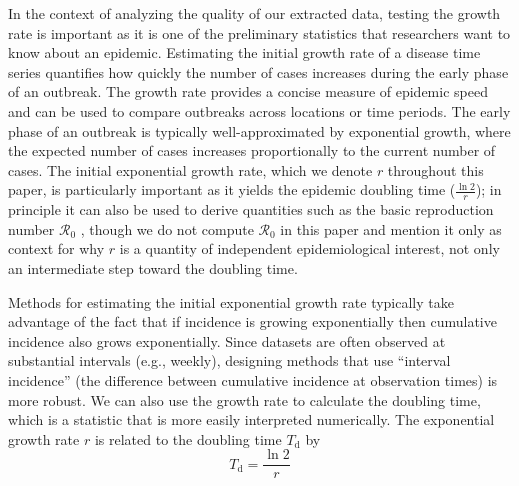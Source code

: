 \documentclass[12pt]{article}
\begin{document}
In the context of analyzing the quality of our extracted data, testing the growth rate is important as it is one of the preliminary statistics that researchers want to know about an epidemic. Estimating the initial growth rate of a disease time series quantifies how quickly the number of cases increases during the early phase of an outbreak. The growth rate provides a concise measure of epidemic speed and can be used to compare outbreaks across locations or time periods. The early phase of an outbreak is typically well-approximated by exponential growth, where the expected number of cases increases proportionally to the current number of cases. The initial exponential growth rate, which we denote $r$ throughout this paper, is particularly important as it yields the epidemic doubling time ($\frac{\ln{2}}{r}$); in principle it can also be used to derive quantities such as the basic reproduction number $\mathcal{R}_0$ \cite{WallLips07}, though we do not compute $\mathcal{R}_0$ in this paper and mention it only as context for why $r$ is a quantity of independent epidemiological interest, not only an intermediate step toward the doubling time.

Methods for estimating the initial exponential growth rate \cite{Ma2014,JaganRpkg} typically take advantage of the fact that if incidence is growing exponentially then cumulative incidence also grows exponentially. Since datasets are often observed at substantial intervals (e.g., weekly), designing methods that use ``interval incidence'' (the difference between cumulative incidence at observation times) is more robust. We can also use the growth rate to calculate the doubling time, which is a statistic that is more easily interpreted numerically.
The exponential growth rate \(r\) is related to the doubling time $T_{\mathrm{d}}$ by
\[
T_{\mathrm{d}} = \frac{\ln 2}{r}
\]
\end{document}
